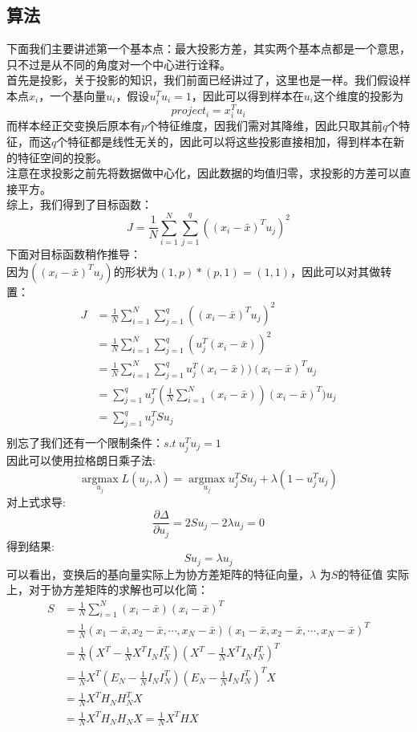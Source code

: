 \documentclass{report}
\begin{document}
\subsection{算法}
下面我们主要讲述第一个基本点：最大投影方差，其实两个基本点都是一个意思，只不过是从不同的角度对一个中心进行诠释。\\
首先是投影，关于投影的知识，我们前面已经讲过了，这里也是一样。我们假设样本点$x_i$，一个基向量$u_i$，假设$u_i^Tu_i=1$，因此可以得到样本在$u_i$这个维度的投影为
$$
project_i=x_i^Tu_i
$$
而样本经正交变换后原本有$p$个特征维度，因我们需对其降维，因此只取其前$q$个特征，而这$q$个特征都是线性无关的，因此可以将这些投影直接相加，得到样本在新的特征空间的投影。\\
注意在求投影之前先将数据做中心化，因此数据的均值归零，求投影的方差可以直接平方。\\
综上，我们得到了目标函数：
$$
J=\frac{1}{N} \sum_{i=1}^{N} \sum_{j=1}^{q}\left(\left(x_{i}-\bar{x}\right)^{T} u_{j}\right)^{2}
$$
下面对目标函数稍作推导：\\
因为$((x_i-\bar{x})^Tu_j)$的形状为$(1,p)* (p,1)=(1,1)$，因此可以对其做转置：
$$
\begin{aligned}
J&=\frac{1}{N} \sum_{i=1}^{N} \sum_{j=1}^{q}\left(\left(x_{i}-\bar{x}\right)^{T} u_{j}\right)^{2}\\
&=\frac{1}{N} \sum_{i=1}^{N} \sum_{j=1}^{q}(u_{j}^T(x_{i}-\bar{x}))^{2}\\
&=\frac{1}{N} \sum_{i=1}^{N} \sum_{j=1}^{q}u_{j}^T(x_{i}-\bar{x}))(x_{i}-\bar{x})^T u_j\\
&=\sum_{j=1}^{q} u_{j}^T(\frac{1}{N} \sum_{i=1}^{N} (x_{i}-\bar{x}))(x_{i}-\bar{x})^T) u_j\\
&=\sum_{j=1}^q u_j^T S u_j\\
\end{aligned}
$$
别忘了我们还有一个限制条件：$s.t\ u_j^T u_j=1$\\
因此可以使用拉格朗日乘子法:
$$
\underset{u_{j}}{\operatorname{argmax}} L\left(u_{j}, \lambda\right)=\underset{u_{j}}{\operatorname{argmax}} u_{j}^{T} S u_{j}+\lambda\left(1-u_{j}^{T} u_{j}\right)
$$
对上式求导:
$$
\frac{\partial \Delta}{\partial u_j}=2S u_j -2\lambda u_j=0
$$
得到结果:
$$
S u_j = \lambda u_j
$$
可以看出，变换后的基向量实际上为协方差矩阵的特征向量，$\lambda$ 为$S$的特征值
实际上，对于协方差矩阵的求解也可以化简：
$$
\begin{aligned}
S &=\frac{1}{N} \sum_{i=1}^{N}\left(x_{i}-\bar{x}\right)\left(x_{i}-\bar{x}\right)^{T} \\
&=\frac{1}{N}\left(x_{1}-\bar{x}, x_{2}-\bar{x}, \cdots, x_{N}-\bar{x}\right)\left(x_{1}-\bar{x}, x_{2}-\bar{x}, \cdots, x_{N}-\bar{x}\right)^{T} \\
&=\frac{1}{N}\left(X^{T}-\frac{1}{N} X^{T} I_{N} I_{N}^{T}\right)\left(X^{T}-\frac{1}{N} X^{T} I_{N} I_{N}^{T}\right)^{T} \\
&=\frac{1}{N} X^{T}\left(E_{N}-\frac{1}{N} I_{N} I_{N}^T\right)\left(E_{N}-\frac{1}{N} I_{N} I_{N}^T\right)^{T} X \\
&=\frac{1}{N} X^{T} H_{N} H_{N}^{T} X \\
&=\frac{1}{N} X^{T} H_{N} H_{N} X=\frac{1}{N} X^{T} H X
\end{aligned}
$$
\end{document}
